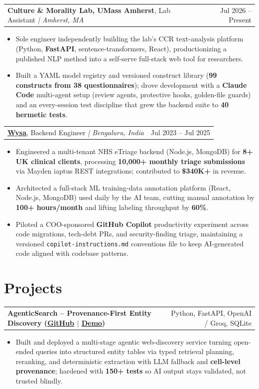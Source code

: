 \documentclass[letterpaper,11pt]{article}
\makeatletter
\newcommand{\expItem}[4]{%
  \vspace{2pt}
  \begin{tabular*}{\textwidth}{@{}l@{\extracolsep{\fill}}r@{}}
    \textbf{#1}, #2 \textit{| #3} & #4 \\
  \end{tabular*}\par\vspace{-3pt}
}
\newcommand{\projItem}[2]{%
  \vspace{2pt}
  \begin{tabular*}{\textwidth}{@{}l@{\extracolsep{\fill}}r@{}}
    \textbf{#1} & #2 \\
  \end{tabular*}\par\vspace{-3pt}
}
\makeatother
\begin{document}
\expItem{Culture \& Morality Lab, UMass Amherst}{Lab Assistant}{Amherst, MA}{Jul 2026 -- Present}
\begin{itemize}
  \item Sole engineer independently building the lab's CCR text-analysis platform (Python, \textbf{FastAPI}, sentence-transformers, React), productionizing a published NLP method into a self-serve full-stack web tool for researchers.
  \item Built a YAML model registry and versioned construct library (\textbf{99 constructs from 38 questionnaires}); drove development with a \textbf{Claude Code} multi-agent setup (review agents, protective hooks, golden-file guards) and an every-session test discipline that grew the backend suite to \textbf{40 hermetic tests}.
\end{itemize}

\expItem{\href{https://www.wysa.io}{Wysa}}{Backend Engineer}{Bengaluru, India}{Jul 2023 -- Jul 2025}
\begin{itemize}
  \item Engineered a multi-tenant NHS eTriage backend (Node.js, MongoDB) for \textbf{8+ UK clinical clients}, processing \textbf{10{,}000+ monthly triage submissions} via Mayden iaptus REST integrations; contributed to \textbf{\$340K+} in revenue.
  \item Architected a full-stack ML training-data annotation platform (React, Node.js, MongoDB) used daily by the AI team, cutting manual annotation by \textbf{100+ hours/month} and lifting labeling throughput by \textbf{60\%}.
  \item Piloted a COO-sponsored \textbf{GitHub Copilot} productivity experiment across code migrations, tech-debt PRs, and security-finding triage, maintaining a versioned \texttt{copilot-instructions.md} conventions file to keep AI-generated code aligned with codebase patterns.
\end{itemize}

\section{Projects}

\projItem{AgenticSearch -- Provenance-First Entity Discovery {\normalfont\small(\href{https://github.com/Deva-1903/ciir_agentic_search}{GitHub} $\vert$ \href{https://agentic-search-negglszkwa-uc.a.run.app}{Demo})}}{Python, FastAPI, OpenAI / Groq, SQLite}
\begin{itemize}
  \item Built and deployed a multi-stage agentic web-discovery service turning open-ended queries into structured entity tables via typed retrieval planning, reranking, and deterministic extraction with LLM fallback and \textbf{cell-level provenance}; hardened with \textbf{150+ tests} so AI output stays validated, not trusted blindly.
\end{itemize}
\end{document}
